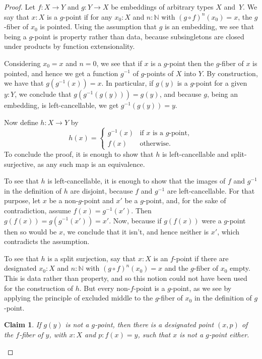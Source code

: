 \documentclass{article}
\newtheorem{claim}[theorem]{Claim}
\theoremstyle{definition}
\begin{document}
\begin{proof}
Let $f : X \to Y$ and $g : Y \to X$ be embeddings of arbitrary types $X$ and~$Y$.
%
We say that $x:X$ is a $g$-point if for any $x_0 : X$ and
$n : \mathbb{N}$ with $(g \circ f)^n (x_0)=x$, the $g$-fiber of $x_0$
is pointed. Using the assumption that $g$ is an embedding, we see
that being a $g$-point is property rather than data, because
subsingletons are closed under products by function extensionality.

Considering $x_0=x$ and $n=0$, we see that if $x$ is a $g$-point then
the $g$-fiber of $x$ is pointed, and hence we get a function
$g^{-1}$ of $g$-points of $X$ into $Y$. By construction, we have that
$g(g^{-1}(x))=x$. In particular, if $g(y)$ is a $g$-point for a given
$y:Y$, we conclude that $g(g^{-1}(g(y)))=g(y)$, and because $g$, being
an embedding, is left-cancellable, we get $g^{-1}(g(y))=y$.

Now define $h:X \to Y$ by
\[
  h(x) = \begin{cases}
           g^{-1}(x) & \text{if $x$ is a $g$-point}, \\
           f(x) & \text{otherwise.}
         \end{cases}
\]
To conclude the proof, it is enough to show that $h$ is left-cancellable and split-surjective, as any such map is an equivalence.

To see that $h$ is left-cancellable, it is enough to show that the
images of $f$ and $g^{-1}$ in the definition of $h$ are disjoint,
because $f$ and $g^{-1}$ are left-cancellable. For that purpose, let
$x$ be a non-$g$-point and $x'$ be a $g$-point, and, for the sake of
contradiction, assume $f(x) = g^{-1}(x')$. Then
$g(f(x))=g(g^{-1}(x'))=x'$. Now, because if $g(f(x))$ were a $g$-point
then so would be $x$, we conclude that it isn't, and hence neither is
$x'$, which contradicts the assumption.

To see that $h$ is a split surjection, say that $x : X$ is an $f$-point if there are designated $x_0 : X$ and $n : \mathbb{N}$ with $(g \circ f)^n (x_0)=x$ and the $g$-fiber of $x_0$ empty. This is data rather than property, and so this notion could not have been used for the construction of $h$. But every non-$f$-point is a $g$-point, as we see by applying the principle of excluded middle to the $g$-fiber of $x_0$ in the definition of $g$-point.

\begin{claim}
  If $g(y)$ is not a $g$-point, then there is a designated point
  $(x,p)$ of the $f$-fiber of $y$, with $x : X$ and $p : f(x)=y$,
  such that $x$ is not a $g$-point either.
\end{claim}


\end{proof}
\end{document}
